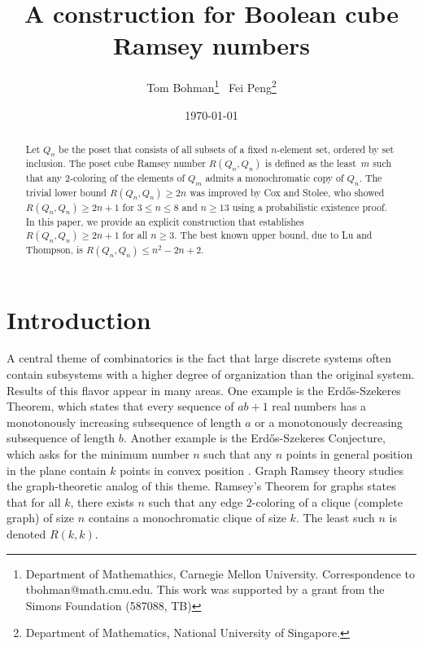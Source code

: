 \documentclass[12pt]{article}
\title{A construction for Boolean cube Ramsey numbers}
\author{Tom Bohman\thanks{Department of Mathemathics, Carnegie Mellon University. Correspondence to tbohman@math.cmu.edu. This work was supported by a grant from the Simons
Foundation (587088, TB)} \, Fei Peng\thanks{Department of Mathematics, National University of Singapore.}}
\date{\today}
\theoremstyle{definition}
\begin{document}
\maketitle
\begin{abstract}
Let $Q_n$ be the poset that consists of all subsets of a fixed $n$-element set, ordered by set inclusion.
The poset cube Ramsey number $R(Q_n,Q_n)$ is defined as the least~$m$ such that any 2-coloring of the elements of $Q_m$ admits a monochromatic copy of $Q_n$. The trivial lower bound $R(Q_n,Q_n)\ge 2n$ was improved by Cox and Stolee, who showed $R(Q_n,Q_n)\ge 2n+1$ for $3\le n\le 8$ and $n\ge 13$ using a probabilistic existence proof. In this paper, we provide an explicit construction that establishes $R(Q_n,Q_n)\ge 2n+1$ for all $n\ge 3$. The best known upper bound, due to Lu and Thompson, is $ R(Q_n, Q_n) \le n^2 - 2n + 2$.
\end{abstract}
\section{Introduction}
A central theme of combinatorics is the fact that large discrete systems often contain subsystems with a higher degree of organization than the original system. Results of this flavor appear in many areas. One example is the Erd\H{o}s-Szekeres Theorem, which states that every sequence of $ab+1$ real numbers has a monotonously increasing subsequence of length $a$ or a monotonously decreasing subsequence of length $b$.
Another example is the Erd\H{o}s-Szekeres Conjecture, which asks for the minimum number $n$ such that any $n$ points in general position in the plane contain $k$ points in convex position \cite{suk}. Graph Ramsey theory \cite{graham1990ramsey} studies the graph-theoretic analog of this theme. Ramsey's Theorem for graphs states that for all $k$, there exists $n$ such that any edge 2-coloring of a clique (complete graph) of size $n$ contains a monochromatic clique of size $k$. The least such $n$ is denoted $R(k,k)$.
\end{document}
